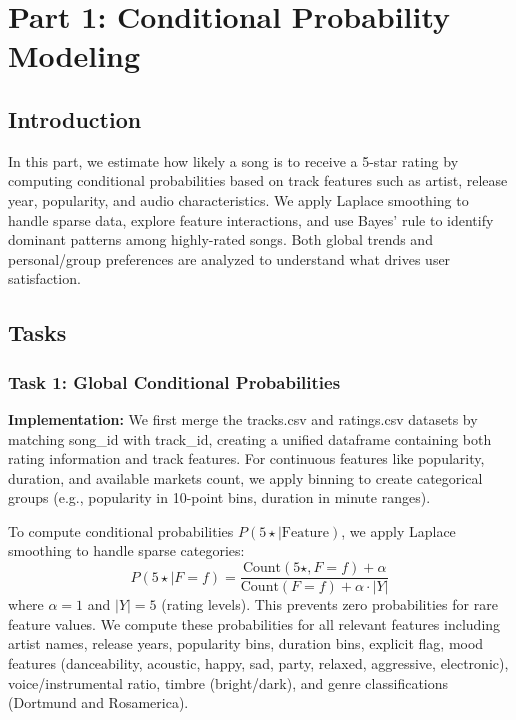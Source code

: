 \documentclass[12pt,a4paper]{article}
\begin{document}
\section{Part 1: Conditional Probability Modeling}

\subsection{Introduction}
In this part, we estimate how likely a song is to receive a 5-star rating by computing conditional probabilities based on track features such as artist, release year, popularity, and audio characteristics. We apply Laplace smoothing to handle sparse data, explore feature interactions, and use Bayes' rule to identify dominant patterns among highly-rated songs. Both global trends and personal/group preferences are analyzed to understand what drives user satisfaction.

\subsection{Tasks}

\subsubsection{Task 1: Global Conditional Probabilities}

\textbf{Implementation:} We first merge the tracks.csv and ratings.csv datasets by matching song\_id with track\_id, creating a unified dataframe containing both rating information and track features. For continuous features like popularity, duration, and available markets count, we apply binning to create categorical groups (e.g., popularity in 10-point bins, duration in minute ranges). 

To compute conditional probabilities $P(5\star \mid \text{Feature})$, we apply Laplace smoothing to handle sparse categories:
\begin{equation}
P(5\star \mid F = f) = \frac{\text{Count}(5\star, F=f) + \alpha}{\text{Count}(F=f) + \alpha \cdot |Y|}
\end{equation}
where $\alpha = 1$ and $|Y| = 5$ (rating levels). This prevents zero probabilities for rare feature values. We compute these probabilities for all relevant features including artist names, release years, popularity bins, duration bins, explicit flag, mood features (danceability, acoustic, happy, sad, party, relaxed, aggressive, electronic), voice/instrumental ratio, timbre (bright/dark), and genre classifications (Dortmund and Rosamerica).
\end{document}
